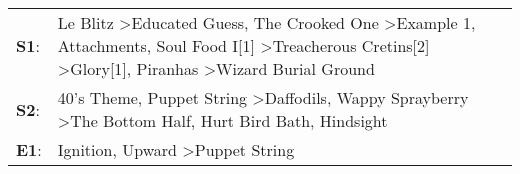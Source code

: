 \begin{supertabular}{p{0.03\textwidth}p{0.92\textwidth}}
 \textbf{S1}:  &  Le Blitz\textsuperscript{} \textgreater \enspace Educated Guess\textsuperscript{}, \enspace The Crooked One\textsuperscript{} \textgreater \enspace Example 1\textsuperscript{}, \enspace Attachments\textsuperscript{}, \enspace Soul Food I[1]\textsuperscript{} \textgreater \enspace Treacherous Cretins[2]\textsuperscript{} \textgreater \enspace Glory[1]\textsuperscript{}, \enspace Piranhas\textsuperscript{} \textgreater \enspace Wizard Burial Ground\textsuperscript{}  \enspace  \\
 \textbf{S2}:  &                                                                                                                                                                        40's Theme\textsuperscript{}, \enspace Puppet String\textsuperscript{} \textgreater \enspace Daffodils\textsuperscript{}, \enspace Wappy Sprayberry\textsuperscript{} \textgreater \enspace The Bottom Half\textsuperscript{}, \enspace Hurt Bird Bath\textsuperscript{}, \enspace Hindsight\textsuperscript{}  \enspace  \\
 \textbf{E1}:  &                                                                                                                                                                                                                                                                                                                                                                   Ignition\textsuperscript{}, \enspace Upward\textsuperscript{} \textgreater \enspace Puppet String\textsuperscript{}  \enspace  \\
\end{supertabular}
